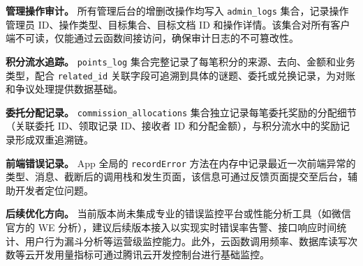 \documentclass[a4paper,12pt]{article}
\begin{document}
\textbf{管理操作审计。} 所有管理后台的增删改操作均写入 \texttt{admin\_logs} 集合，记录操作管理员 ID、操作类型、目标集合、目标文档 ID 和操作详情。该集合对所有客户端不可读，仅能通过云函数间接访问，确保审计日志的不可篡改性。

\textbf{积分流水追踪。} \texttt{points\_log} 集合完整记录了每笔积分的来源、去向、金额和业务类型，配合 \texttt{related\_id} 关联字段可追溯到具体的谜题、委托或兑换记录，为对账和争议处理提供数据基础。

\textbf{委托分配记录。} \texttt{commission\_allocations} 集合独立记录每笔委托奖励的分配细节（关联委托 ID、领取记录 ID、接收者 ID 和分配金额），与积分流水中的奖励记录形成双重追溯链。

\textbf{前端错误记录。} App 全局的 \texttt{recordError} 方法在内存中记录最近一次前端异常的类型、消息、截断后的调用栈和发生页面，该信息可通过反馈页面提交至后台，辅助开发者定位问题。

\textbf{后续优化方向。} 当前版本尚未集成专业的错误监控平台或性能分析工具（如微信官方的 WE 分析），建议后续版本接入以实现实时错误率告警、接口响应时间统计、用户行为漏斗分析等运营级监控能力。此外，云函数调用频率、数据库读写次数等云开发用量指标可通过腾讯云开发控制台进行基础监控。
\end{document}
